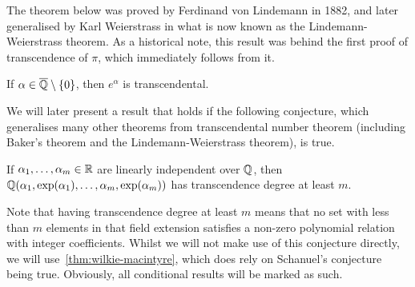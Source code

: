 
The theorem below was proved by Ferdinand von Lindemann in 1882, and later generalised by Karl Weierstrass in what is now known as the Lindemann-Weierstrass theorem. As a historical note, this result was behind the first proof of transcendence of $\pi$, which immediately follows from it.

\begin{theorem}[Lindemann]
If $\alpha \in \overline{\mathbb{Q}} \setminus \lbrace 0 \rbrace$, then $e^{\alpha}$ is transcendental.
\end{theorem}

We will later present a result that holds if the following conjecture, which generalises many other theorems from transcendental number theorem (including Baker's theorem and the Lindemann-Weierstrass theorem), is true.

\begin{conjecture}[Schanuel]
  If $\alpha_{1}, \ldots, \alpha_{m} \in \mathbb{R}$ are linearly independent over $\mathbb{Q}$, then $\mathbb{Q}(\alpha_{1}, \exp(\alpha_{1}), \ldots, \alpha_{m}, \exp(\alpha_{m}))$ has transcendence degree at least $m$.
\end{conjecture}
Note that having transcendence degree at least $m$ means that no set with less than $m$ elements in that field extension satisfies a non-zero polynomial relation with integer coefficients. Whilst we will not make use of this conjecture directly, we will use~\cref{thm:wilkie-macintyre}, which does rely on Schanuel's conjecture being true. Obviously, all conditional results will be marked as such.
